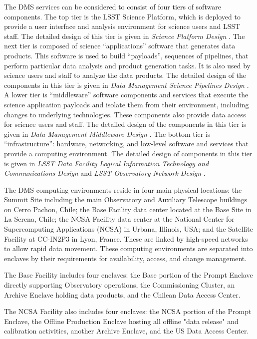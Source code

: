\documentclass[DM,toc]{lsstdoc}
\begin{document}
The DMS services can be considered to consist of four tiers of software
components. The top tier is the LSST Science Platform, which is deployed
to provide a user
interface and analysis environment for science users and LSST staff. The
detailed design of this tier is given in \textit{Science Platform Design} . The next
tier is composed of science ``applications'' software that generates
data products. This software is used to build ``payloads'', sequences of
pipelines, that perform particular data analysis and product generation
tasks. It is also used by science users and staff to analyze the data
products. The detailed design of the components in this tier is given in
\textit{Data Management Science Pipelines Design} . A lower tier is
``middleware'' software components and services that execute the science
application payloads and isolate them from their environment, including
changes to underlying technologies. These components also provide data
access for science users and staff. The detailed design of the
components in this tier is given in \textit{Data Management Middleware Design} .
The bottom tier is ``infrastructure'': hardware, networking,
and low-level software and services that provide a computing
environment. The detailed design of components in this tier is given in
\textit{LSST Data Facility Logical Information Technology and Communications Design}  and \textit{LSST Observatory Network Design} .

The DMS computing environments reside in four main physical locations:
the Summit Site including the main Observatory and Auxiliary Telescope
buildings on Cerro Pachon, Chile; the Base Facility data center located
at the Base Site in La Serena, Chile; the NCSA Facility data center
at the National Center for Supercomputing Applications (NCSA) in Urbana,
Illinois, USA; and the Satellite Facility at CC-IN2P3 in Lyon,
France. These are linked by high-speed networks to allow rapid data
movement.
These computing environments are separated into enclaves by their requirements for availability, access, and change management.

The Base Facility includes four enclaves: the Base portion of the Prompt Enclave directly supporting Observatory operations, the Commissioning Cluster, an Archive Enclave holding data products, and the Chilean Data Access Center.

The NCSA Facility also includes four enclaves: the NCSA portion of the Prompt Enclave, the Offline Production Enclave hosting all offline "data release" and calibration activities, another Archive Enclave, and the US Data Access Center.
\end{document}
